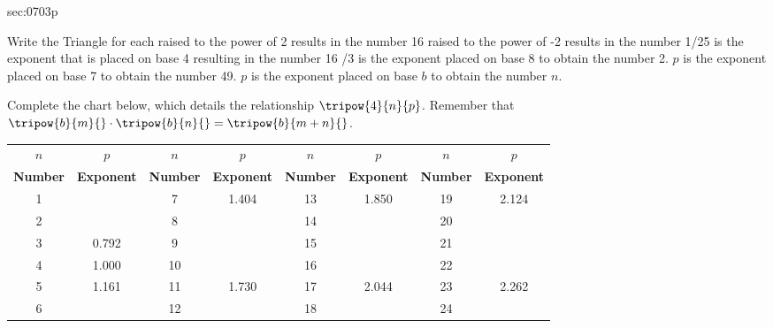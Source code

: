 \noindent
{}\label{sec:0703p}
\begin{exercises}{sec:0703p}
\begin{multicols}{2}
\lab{} Write the Triangle for each
 raised to the power of 2 results in the number 16
\vspace{5mm}
 raised to the power of -2 results in the number 1/25
\vspace{5mm}
 is the exponent that is placed on base 4 resulting in the number 16
\vspace{5mm}
/3 is the exponent placed on base 8 to obtain the number 2.
\vspace{5mm}
\subprob $p$ is the exponent placed on base 7 to obtain the number 49.
\vspace{5mm}
\subprob $p$ is the exponent placed on base $b$ to obtain the number $n$.
\vspace{5mm}
\end{multicols}

\lab Complete the chart below, which details the relationship $\tripow{4}{n}{p}$.  Remember that $\tripow{b}{m}{}\cdot\tripow{b}{n}{}=\tripow{b}{m+n}{}$.
\begin{tabular}{ c | c || c | c || c | c || c | c }
	\textbf{$n$} & \textbf{$p$} & \textbf{$n$} & \textbf{$p$} & \textbf{$n$} & \textbf{$p$} & \textbf{$n$} & \textbf{$p$} \\
	\textbf{Number} & \textbf{Exponent} & \textbf{Number} & \textbf{Exponent} & \textbf{Number} & \textbf{Exponent} & \textbf{Number} & \textbf{Exponent} \\ \hline \hline
	1 & & 7 & 1.404 & 13 & 1.850 & 19 & 2.124 \\ \hline
	2 & & 8 & & 14 & & 20 & \\ \hline
	3 & 0.792 & 9 & & 15 & & 21 & \\ \hline
	4 & 1.000 & 10 & & 16 & & 22 & \\ \hline
	5 & 1.161 & 11 & 1.730 & 17 & 2.044 & 23 & 2.262 \\ \hline
	6 & & 12 & & 18 & & 24 & \\ \hline
\end{tabular}


\end{exercises}
